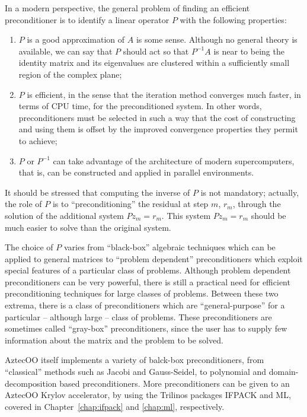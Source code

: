 In a modern perspective, the general problem of finding an efficient
preconditioner is to identify a linear operator $P$ with the following
properties:
\begin{enumerate}
\item $P$ is a good approximation of $A$ is some sense. Although no
  general theory is available, we can say that $P$ should act so that
  $P^{-1} A$ is near to being the identity matrix and its eigenvalues
  are clustered within a sufficiently small region of the complex plane;
\item $P$ is efficient, in the sense that the iteration method converges
  much faster, in terms of CPU time, for the preconditioned system.  In
  other words, preconditioners must be selected in such a way that the
  cost of constructing and using them is offset by the improved
  convergence properties they permit to achieve;
\item $P$ or $P^{-1}$ can take advantage of the architecture of modern
  supercomputers, that is, can be constructed and applied in parallel
  environments.
\end{enumerate}

It should be stressed that computing the inverse of $P$ is not
mandatory; actually, the role of $P$ is to ``preconditioning'' the
residual at step $m$, $r_m$, through the solution of the additional
system $P z_m = r_m$. This system $P z_m = {r}_m$ should be much easier
to solve than the original system.

\smallskip

The choice of $P$ varies from ``black-box'' algebraic techniques which
can be applied to general matrices to ``problem dependent''
preconditioners which exploit special features of a particular class
of problems. Although problem dependent preconditioners can be very
powerful, there is still a practical need for efficient
preconditioning techniques for large classes of problems. Between
these two extrema, there is a class of preconditioners which are
``general-purpose'' for a particular -- although large -- class of
problems.  These preconditioners are sometimes called ``gray-box''
preconditioners, since the user has to supply few information about
the matrix and the problem to be solved.

AztecOO itself implements a variety of balck-box preconditioners, from
``classical'' methods such as Jacobi and Gauss-Seidel, to polynomial and
domain-decomposition based preconditioners. More preconditioners can be
given to an AztecOO Krylov accelerator, by using the Trilinos packages
IFPACK and ML, covered in Chapter~\ref{chap:ifpack} and \ref{chap:ml},
respectively.

